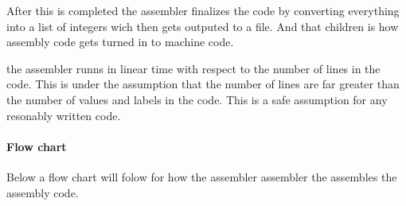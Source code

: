 \documentclass{article}
\begin{document}
After this is completed the assembler finalizes the code by converting
everything into a list of integers wich then gets outputed to a file. And that
children is how assembly code gets turned in to machine code.

the assembler runns in linear time with respect to the number of lines in the
code. This is under the assumption that the number of lines are far greater than
the number of values and labels in the code. This is a safe assumption for any
resonably written code.

\paragraph{Flow chart}
Below a flow chart will folow for how the assembler assembler the assembles the
assembly code.
 
\end{document}
